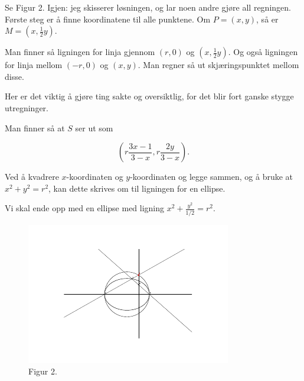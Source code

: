 \documentclass[11pt, norsk]{article}
\begin{document}
\begin{losn}
Se Figur 2. Igjen: jeg skisserer løsningen, og lar noen andre gjøre all regningen. Første steg er å finne koordinatene til alle punktene. Om $P=(x,y)$, så er $M=(x,\frac 12 y)$.

Man finner så ligningen for linja gjennom $(r,0)$ og $(x,\frac 12y)$. Og også ligningen for linja mellom $(-r,0)$ og $(x,y)$. Man regner så ut skjæringspunktet mellom disse.

Her er det viktig å gjøre ting sakte og oversiktlig, for det blir fort ganske stygge utregninger. 

Man finner så at $S$ ser ut som

$$
\left(r \frac{3x-1}{3-x}, r \frac{2y}{3-x}\right).
$$

Ved å kvadrere $x$-koordinaten og $y$-koordinaten og legge sammen, og å bruke at $x^2+y^2=r^2$, kan dette skrives om til ligningen for en ellipse.

Vi skal ende opp med en ellipse med ligning $x^2 + \frac{y^2}{1/2} = r^2$.
\begin{figure}
\begin{center}
\includegraphics[scale=3.5]{mat2500oppg9bilde}
\caption{Figur 2.}
\end{center}
\end{figure}
\end{losn}
\end{document}
